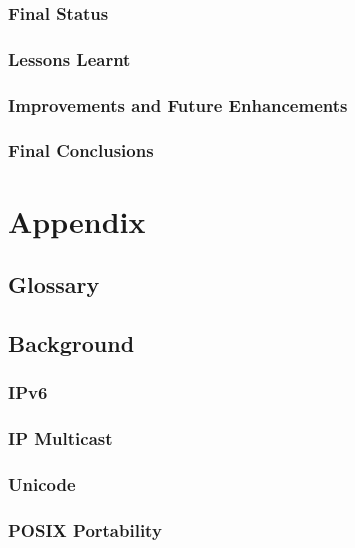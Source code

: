 \documentclass[a4paper,12pt]{report}
\begin{document}
\section{Final Status}

\section{Lessons Learnt}

\section{Improvements and Future Enhancements}

\section{Final Conclusions}


\part*{Appendix}

\appendix


\chapter{Glossary}




\chapter{Background}

\section{IPv6}



\section{IP Multicast}

\section{Unicode}

\section{POSIX Portability}
\end{document}

